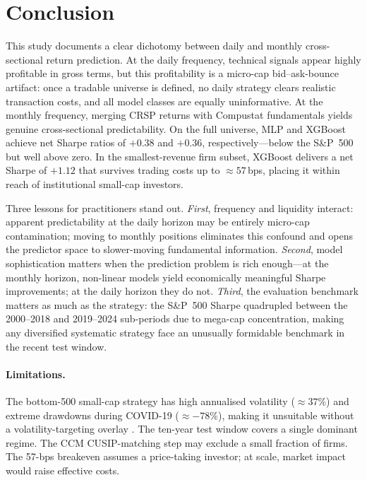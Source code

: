 \documentclass[11pt,a4paper]{article}
\begin{document}
\section{Conclusion}
\label{sec:conclusion}

This study documents a clear dichotomy between daily and monthly cross-sectional
return prediction. At the daily frequency, technical signals appear highly
profitable in gross terms, but this profitability is a micro-cap bid--ask-bounce
artifact: once a tradable universe is defined, no daily strategy clears realistic
transaction costs, and all model classes are equally uninformative. At the
monthly frequency, merging CRSP returns with Compustat fundamentals yields
genuine cross-sectional predictability. On the full universe, MLP and XGBoost
achieve net Sharpe ratios of $+0.38$ and $+0.36$, respectively---below the
S\&P~500 but well above zero. In the smallest-revenue firm subset, XGBoost
delivers a net Sharpe of $+1.12$ that survives trading costs up to $\approx 57$\,bps,
placing it within reach of institutional small-cap investors.

Three lessons for practitioners stand out. \textit{First}, frequency and
liquidity interact: apparent predictability at the daily horizon may be entirely
micro-cap contamination; moving to monthly positions eliminates this confound
and opens the predictor space to slower-moving fundamental information.
\textit{Second}, model sophistication matters when the prediction problem is
rich enough---at the monthly horizon, non-linear models yield economically
meaningful Sharpe improvements; at the daily horizon they do not.
\textit{Third}, the evaluation benchmark matters as much as the strategy: the
S\&P~500 Sharpe quadrupled between the 2000--2018 and 2019--2024 sub-periods
due to mega-cap concentration, making any diversified systematic strategy face
an unusually formidable benchmark in the recent test window.

\paragraph{Limitations.}
The bottom-500 small-cap strategy has high annualised volatility ($\approx 37\%$)
and extreme drawdowns during COVID-19 ($\approx -78\%$), making it unsuitable
without a volatility-targeting overlay \citep{moreiramuir2017}. The ten-year
test window covers a single dominant regime. The CCM CUSIP-matching step may
exclude a small fraction of firms. The 57-bps breakeven assumes a price-taking
investor; at scale, market impact would raise effective costs.
\end{document}
